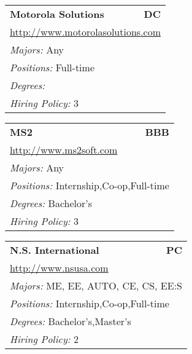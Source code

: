 \documentclass[twoside]{article}
\begin{document}
\begin{center}
\begin{multicols}{3}
\begin{FlushLeft}
\begin{minipage}{\columnwidth}
\end{minipage}
 
\begin{minipage}{\columnwidth}\begin{tabularx}{.95\columnwidth}{Xr}
                 {\Large\bf Motorola Solutions} & {\Large\bf DC}\\
    \multicolumn{2}{p{.95\columnwidth}}{\url{http://www.motorolasolutions.com}}\\
    \multicolumn{2}{p{.95\columnwidth}}{\emph{Majors:} Any}\\
    \multicolumn{2}{p{.95\columnwidth}}{\emph{Positions:} Full-time}\\
    \multicolumn{2}{p{.95\columnwidth}}{\emph{Degrees:} }\\
    \multicolumn{2}{p{.95\columnwidth}}{\emph{Hiring Policy:} 3}\\
    \end{tabularx}
    
\end{minipage}
 
\begin{minipage}{\columnwidth}\begin{tabularx}{.95\columnwidth}{Xr}
                 {\Large\bf MS2} & {\Large\bf BBB}\\
    \multicolumn{2}{p{.95\columnwidth}}{\url{http://www.ms2soft.com}}\\
    \multicolumn{2}{p{.95\columnwidth}}{\emph{Majors:} Any}\\
    \multicolumn{2}{p{.95\columnwidth}}{\emph{Positions:} Internship,Co-op,Full-time}\\
    \multicolumn{2}{p{.95\columnwidth}}{\emph{Degrees:} Bachelor's}\\
    \multicolumn{2}{p{.95\columnwidth}}{\emph{Hiring Policy:} 3}\\
    \end{tabularx}
    
\end{minipage}
 
\begin{minipage}{\columnwidth}\begin{tabularx}{.95\columnwidth}{Xr}
                 {\Large\bf N.S. International} & {\Large\bf PC}\\
    \multicolumn{2}{p{.95\columnwidth}}{\url{http://www.nsusa.com}}\\
    \multicolumn{2}{p{.95\columnwidth}}{\emph{Majors:} ME, EE, AUTO, CE, CS, EE:S}\\
    \multicolumn{2}{p{.95\columnwidth}}{\emph{Positions:} Internship,Co-op,Full-time}\\
    \multicolumn{2}{p{.95\columnwidth}}{\emph{Degrees:} Bachelor's,Master's}\\
    \multicolumn{2}{p{.95\columnwidth}}{\emph{Hiring Policy:} 2}\\
    \end{tabularx}
    

\end{minipage}
\end{FlushLeft}
\end{multicols}
\end{center}
\end{document}
